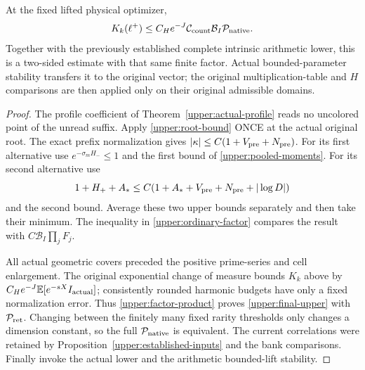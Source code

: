 \begin{theorem}
\label{upper:sharp-upper}
At the fixed lifted physical optimizer,
\begin{equation}
 K_k(\ell^+)\leq C_H e^{-J}
               \mathcal C_{\rm count}\mathcal B_I
               \mathcal P_{\rm native}.
 \label{upper:final-upper}
\end{equation}
Together with the previously established complete intrinsic arithmetic
lower, this is a two-sided estimate with that same finite factor.
Actual bounded-parameter stability transfers it to the original vector;
the original multiplication-table and $H$ comparisons are then applied
only on their original admissible domains.
\end{theorem}

\begin{proof}
The profile coefficient of Theorem~\ref{upper:actual-profile} reads no
uncolored point of the unread suffix.  Apply
\eqref{upper:root-bound} ONCE at the actual original root.  The exact
prefix normalization gives
$|\kappa|\leq C(1+V_{\rm pre}+N_{\rm pre})$.
For its first alternative use $e^{-\sigma_mH_-}\leq1$ and the first
bound of \eqref{upper:pooled-moments}.  For its second alternative use
\[
 1+H_++A_*\leq C(1+A_*+V_{\rm pre}+N_{\rm pre}+|\log D|)
\]
and the second bound.  Average these two upper bounds separately and
then take their minimum.  The inequality in
\eqref{upper:ordinary-factor} compares the result with
$C\mathcal B_I\prod_jF_j$.

All actual geometric covers preceded the positive prime-series and
cell enlargement.  The original exponential change of measure bounds
$K_k$ above by $C_H e^{-J}\mathbb E[e^{-sX}I_{\rm actual}]$;
consistently rounded harmonic budgets have only a fixed normalization
error.  Thus
\eqref{upper:factor-product} proves \eqref{upper:final-upper} with
$\mathcal P_{\rm ret}$.  Changing between the finitely many fixed
rarity thresholds only changes a dimension constant, so the full
$\mathcal P_{\rm native}$ is equivalent.  The current correlations
were retained by Proposition~\ref{upper:established-inputs} and the
bank comparisons.  Finally invoke the actual lower and the arithmetic
bounded-lift stability.
\end{proof}
